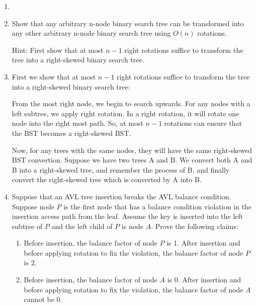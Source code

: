 \documentclass[12pt,a4paper]{article}
\makeatletter
\newtheorem*{solution}{Solution}
\theoremstyle{definition}
\renewenvironment{solution}[1][Solution] {\par\pushQED{\qed}\normalfont\topsep6\p@\@plus6\p@\relax\trivlist\item[\hskip\labelsep\bfseries#1\@addpunct{.}]\ignorespaces}{\popQED\endtrivlist\@endpefalse} \makeatother
\makeatother
\begin{document}
\begin{enumerate}
\begin{solution}
\end{solution}

\item  Show that any arbitrary n-node binary search tree can be transformed into any other arbitrary n-node binary search tree using $O(n)$ rotations. 

	{\color{blue} Hint: First show that at most $n-1$ right rotations suffice to transform the tree into a right-skewed binary
search tree.}

\begin{solution} 
First we show that at most $n-1$ right rotations suffice to transform the tree into a right-skewed binary search tree:

From the most right node, we begin to search upwards. For any nodes with a left subtree, we apply right rotation. In a right rotation, it will rotate one node into the right most path. So, at most $n-1$ rotations can ensure that the BST becomes a right-skewed BST.

Now, for any trees with the same nodes, they will have the same right-skewed BST convertion. Suppose we have two trees A and B. We convert both A and B into a right-skewed tree, and remember the process of B, and finally convert the right-skewed tree which is converted by A into B.
\end{solution}

\item  Suppose that an AVL tree insertion breaks the AVL balance condition. Suppose node $P$ is the first node that has a balance condition violation in the insertion access path from the leaf. Assume the key is inserted into the left subtree of $P$ and the left child of $P$ is node $A$. Prove the following claims:
	\begin{enumerate}
		\item  Before insertion, the balance factor of node $P$ is 1. After insertion and before applying rotation to ﬁx the violation, the balance factor of node $P$ is 2.
		\item Before insertion, the balance factor of node $A$ is 0. After insertion and before applying rotation to ﬁx the violation, the balance factor of node $A$ cannot be 0.
	\end{enumerate}
	

\end{enumerate}
\end{document}
